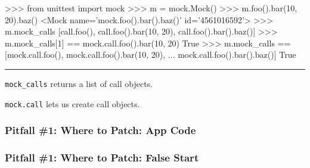 \documentclass[xcolor={svgnames}]{beamer}
\newcommand{\pycode}[2][]{\lstinline[style=python,#1]{#2}}
\newcommand{\pyfile}[2][]{}
\newcommand{\hr}[2]{\vspace{#1}\hrule height 0.01mm\vspace{#2}}
\begin{document}
\begin{frame}[t,fragile]
\begin{onlyenv}
        \begin{pyenv}[gobble=12]
            >>> from unittest import mock
            >>> m = mock.Mock()
            >>> m.foo().bar(10, 20).baz()
            <Mock name='mock.foo().bar().baz()' id='4561016592'>
            >>> m.mock_calls
            [call.foo(), call.foo().bar(10, 20), call.foo().bar().baz()]
            >>> m.mock_calls[1] == mock.call.foo().bar(10, 20)
            True
            >>> m.mock_calls == [mock.call.foo(), mock.call.foo().bar(10, 20),
            ...                  mock.call.foo().bar().baz()]
            True
        \end{pyenv}
        \hr{1mm}{1mm}
        \pycode{mock_calls} returns a list of call objects.

        \pycode{mock.call} lets us create call objects.
    \end{onlyenv}
\end{frame}


\begin{frame}[t]
    \frametitle{Pitfall \#1: Where to Patch: App Code}
    \pyfile{examples/ex1/app.py}
\end{frame}


\begin{frame}[t]
    \frametitle{Pitfall \#1: Where to Patch: False Start}
    \pyfile{examples/ex1/testbad.py}
\end{frame}
\end{document}

